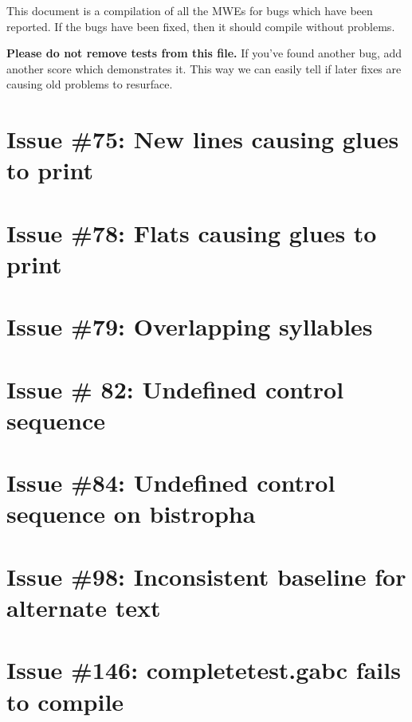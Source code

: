 \documentclass[11pt]{article}
\begin{document}
This document is a compilation of all the MWEs for bugs which have been reported.  If the bugs have been fixed, then it should compile without problems.

\textbf{Please do not remove tests from this file.}  If you've found another bug, add another score which demonstrates it.  This way we can easily tell if later fixes are causing old problems to resurface.

\section{Issue \#75: New lines causing glues to print}




\section{Issue \#78: Flats causing glues to print}

\section{Issue \#79: Overlapping syllables}

\section{Issue \# 82: Undefined control sequence}

\section{Issue \#84: Undefined control sequence on bistropha}

\section{Issue \#98: Inconsistent baseline for alternate text}

\section{Issue \#146: completetest.gabc fails to compile}
\end{document}
